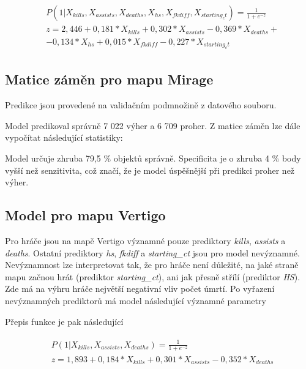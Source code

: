 \begin{align}
    \begin{split}
        &P(1 | X_{kills}, X_{assists}, X_{deaths}, X_{hs}, X_{fkdiff}, X_{starting_ct}) = \frac{1}{1 + e^{-z}} \\
        &z = 2,446 + 0,181*X_{kills} + 0,302*X_{assists} - 0,369*X_{deaths} + \\
        &- 0,134*X_{hs} + 0,015*X_{fkdiff} - 0,227*X_{starting_ct}
    \end{split}
\end{align}

\subsection{Matice záměn pro mapu Mirage}
Predikce jsou provedené na validačním podmnožině z datového souboru.



Model predikoval správně 7 022 výher a 6 709 proher. Z matice záměn lze dále vypočítat následující statistiky:



Model určuje zhruba 79,5 \% objektů správně. Specificita je o zhruba 4 \% body vyšší než senzitivita, což značí, že je model úspěšnější při predikci proher
než výher.

\subsection{Model pro mapu Vertigo}



Pro hráče jsou na mapě Vertigo významné pouze prediktory \textit{kills}, \textit{assists} a \textit{deaths}. Ostatní prediktory \textit{hs}, \textit{fkdiff} a \textit{starting\_ct}
jsou pro model nevýznamné. Nevýznamnost lze interpretovat tak, že pro hráče není důležité, na jaké straně mapu začnou hrát (prediktor  \textit{starting\_ct}), ani jak přesně
střílí (prediktor \textit{HS}). Zde má na výhru hráče největší negativní vliv počet úmrtí. Po vyřazení nevýznamných prediktorů má model následující významné parametry



Přepis funkce je pak následující

\begin{align}
    \begin{split}
        &P(1 | X_{kills}, X_{assists}, X_{deaths}) = \frac{1}{1 + e^{-z}} \\
        &z = 1,893 + 0,184*X_{kills} + 0,301*X_{assists} - 0,352*X_{deaths}
    \end{split}
\end{align}

